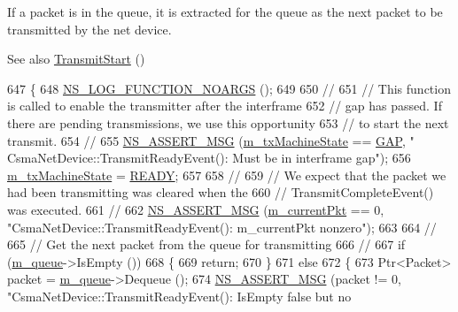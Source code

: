 If a packet is in the queue, it is extracted for the queue as the next packet to be transmitted by the net device.

\begin{DoxySeeAlso}{See also}
\hyperlink{classns3_1_1CsmaNetDevice_a4120db41aa1f41a5e1d59220b306f1e8}{Transmit\+Start} () 
\end{DoxySeeAlso}

\begin{DoxyCode}
647 \{
648   \hyperlink{log-macros-disabled_8h_a8f7e4afc291c9d29a65c18ac1f79197b}{NS\_LOG\_FUNCTION\_NOARGS} ();
649 
650   \textcolor{comment}{//}
651   \textcolor{comment}{// This function is called to enable the transmitter after the interframe}
652   \textcolor{comment}{// gap has passed.  If there are pending transmissions, we use this opportunity}
653   \textcolor{comment}{// to start the next transmit.}
654   \textcolor{comment}{//}
655   \hyperlink{assert_8h_aff5ece9066c74e681e74999856f08539}{NS\_ASSERT\_MSG} (\hyperlink{classns3_1_1CsmaNetDevice_af07031cad3f8bd8c4b33ba77fa706e99}{m\_txMachineState} == \hyperlink{classns3_1_1CsmaNetDevice_a46c532357164a954c46a01f05f8d78f4ab6c58ad6a7f71f004ea78a8ccb9362c6}{GAP}, \textcolor{stringliteral}{"
      CsmaNetDevice::TransmitReadyEvent(): Must be in interframe gap"});
656   \hyperlink{classns3_1_1CsmaNetDevice_af07031cad3f8bd8c4b33ba77fa706e99}{m\_txMachineState} = \hyperlink{classns3_1_1CsmaNetDevice_a46c532357164a954c46a01f05f8d78f4a50a4f4ac7775f95f3ec1d4624213bee2}{READY};
657 
658   \textcolor{comment}{//}
659   \textcolor{comment}{// We expect that the packet we had been transmitting was cleared when the }
660   \textcolor{comment}{// TransmitCompleteEvent() was executed.}
661   \textcolor{comment}{//}
662   \hyperlink{assert_8h_aff5ece9066c74e681e74999856f08539}{NS\_ASSERT\_MSG} (\hyperlink{classns3_1_1CsmaNetDevice_a83f2aa389f676dec6bd1ff056bd61942}{m\_currentPkt} == 0, \textcolor{stringliteral}{"CsmaNetDevice::TransmitReadyEvent():
       m\_currentPkt nonzero"});
663 
664   \textcolor{comment}{//}
665   \textcolor{comment}{// Get the next packet from the queue for transmitting}
666   \textcolor{comment}{//}
667   \textcolor{keywordflow}{if} (\hyperlink{classns3_1_1CsmaNetDevice_a499be4029c01107f7f16f5371843ffde}{m\_queue}->IsEmpty ())
668     \{
669       \textcolor{keywordflow}{return};
670     \}
671   \textcolor{keywordflow}{else}
672     \{
673       Ptr<Packet> packet = \hyperlink{classns3_1_1CsmaNetDevice_a499be4029c01107f7f16f5371843ffde}{m\_queue}->Dequeue ();
674       \hyperlink{assert_8h_aff5ece9066c74e681e74999856f08539}{NS\_ASSERT\_MSG} (packet != 0, \textcolor{stringliteral}{"CsmaNetDevice::TransmitReadyEvent(): IsEmpty false but no
}
\end{DoxyCode}
